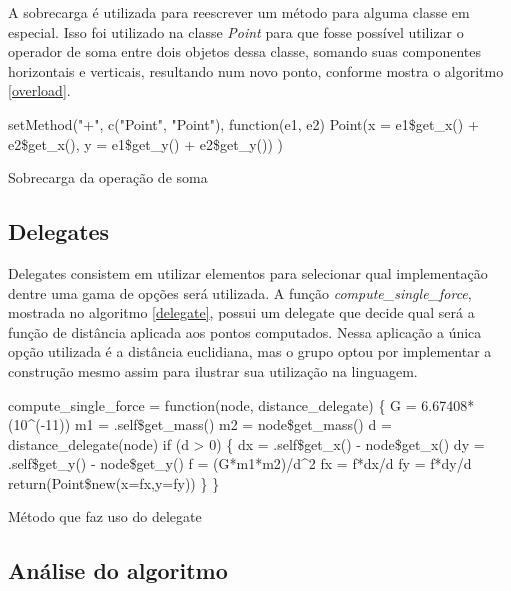 \documentclass[rel_mlp]{iiufrgs}
\makeatletter
\newcommand{\nosemic}{\renewcommand{\@endalgocfline}{\relax}}%
\makeatother
\begin{document}
    A sobrecarga é utilizada para reescrever um método para alguma classe em especial. Isso foi utilizado
    na classe \textit{Point} para que fosse possível utilizar o operador de soma entre dois objetos dessa
    classe, somando suas componentes horizontais e verticais, resultando num novo ponto, conforme mostra
    o algoritmo \ref{overload}.

    \begin{algorithm}
    \label{overload}
    \nosemic setMethod("+", c("Point", "Point"), function(e1, e2) {\;
    \nosemic  Point(x = e1{\$}get{\_}x() + e2{\$}get{\_}x(), y = e1{\$}get{\_}y() + e2{\$}get{\_}y())\;
    \nosemic })\;

    \caption{Sobrecarga da operação de soma}
    \end{algorithm}


\subsection{Delegates}

    Delegates consistem em utilizar elementos para selecionar qual implementação dentre uma gama
    de opções será utilizada.
    A função \textit{compute{\_}single{\_}force}, mostrada no algoritmo \ref{delegate}, possui um
    delegate que decide qual será a função de distância aplicada aos pontos computados. Nessa aplicação
    a única opção utilizada é a distância euclidiana, mas o grupo optou por implementar a construção
    mesmo assim para ilustrar sua utilização na linguagem.

\begin{algorithm}
\label{delegate}
\nosemic compute{\_}single{\_}force = function(node, distance{\_}delegate) {\{}\;
\nosemic  G = 6.67408*(10\string^(-11))\;
\nosemic  m1 = .self{\$}get{\_}mass()\;
\nosemic  m2 = node{\$}get{\_}mass()\;
\nosemic  d = distance{\_}delegate(node)\;
\nosemic  if (d > 0) {\{}\;
\nosemic    dx = .self{\$}get{\_}x() - node{\$}get{\_}x()\;
\nosemic    dy = .self{\$}get{\_}y() - node{\$}get{\_}y()\;
\nosemic    f = (G*m1*m2)/d\string^2\;
\nosemic    fx = f*dx/d\;
\nosemic    fy = f*dy/d\;
\nosemic    return(Point{\$}new(x=fx,y=fy))\;
\nosemic  {\}}\;
\nosemic {\}}\;
\caption{Método que faz uso do delegate}
\end{algorithm}


\subsection{Análise do algoritmo}
\end{document}
